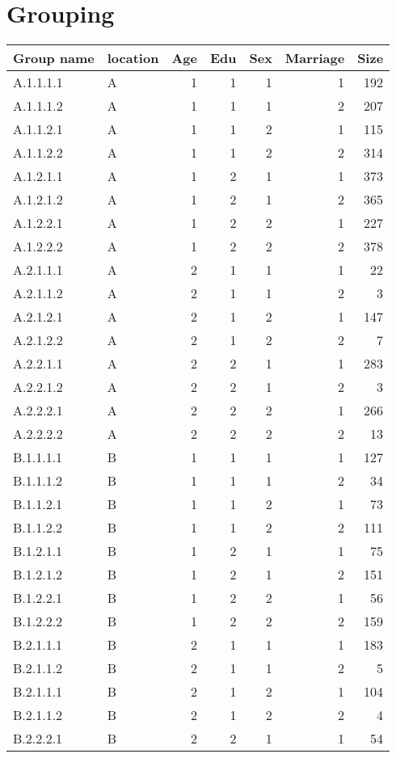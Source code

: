 \documentclass[11pt]{article}
\begin{document}
\section{Grouping}
\label{sec-2}
\begin{center}
\begin{tabular}{llrrrrr}
Group name & location & Age & Edu & Sex & Marriage & Size\\
\hline
A.1.1.1.1 & A & 1 & 1 & 1 & 1 & 192\\
A.1.1.1.2 & A & 1 & 1 & 1 & 2 & 207\\
A.1.1.2.1 & A & 1 & 1 & 2 & 1 & 115\\
A.1.1.2.2 & A & 1 & 1 & 2 & 2 & 314\\
A.1.2.1.1 & A & 1 & 2 & 1 & 1 & 373\\
A.1.2.1.2 & A & 1 & 2 & 1 & 2 & 365\\
A.1.2.2.1 & A & 1 & 2 & 2 & 1 & 227\\
A.1.2.2.2 & A & 1 & 2 & 2 & 2 & 378\\
A.2.1.1.1 & A & 2 & 1 & 1 & 1 & 22\\
A.2.1.1.2 & A & 2 & 1 & 1 & 2 & 3\\
A.2.1.2.1 & A & 2 & 1 & 2 & 1 & 147\\
A.2.1.2.2 & A & 2 & 1 & 2 & 2 & 7\\
A.2.2.1.1 & A & 2 & 2 & 1 & 1 & 283\\
A.2.2.1.2 & A & 2 & 2 & 1 & 2 & 3\\
A.2.2.2.1 & A & 2 & 2 & 2 & 1 & 266\\
A.2.2.2.2 & A & 2 & 2 & 2 & 2 & 13\\
B.1.1.1.1 & B & 1 & 1 & 1 & 1 & 127\\
B.1.1.1.2 & B & 1 & 1 & 1 & 2 & 34\\
B.1.1.2.1 & B & 1 & 1 & 2 & 1 & 73\\
B.1.1.2.2 & B & 1 & 1 & 2 & 2 & 111\\
B.1.2.1.1 & B & 1 & 2 & 1 & 1 & 75\\
B.1.2.1.2 & B & 1 & 2 & 1 & 2 & 151\\
B.1.2.2.1 & B & 1 & 2 & 2 & 1 & 56\\
B.1.2.2.2 & B & 1 & 2 & 2 & 2 & 159\\
B.2.1.1.1 & B & 2 & 1 & 1 & 1 & 183\\
B.2.1.1.2 & B & 2 & 1 & 1 & 2 & 5\\
B.2.1.1.1 & B & 2 & 1 & 2 & 1 & 104\\
B.2.1.1.2 & B & 2 & 1 & 2 & 2 & 4\\
B.2.2.2.1 & B & 2 & 2 & 1 & 1 & 54\\

\end{tabular}
\end{center}
\end{document}
